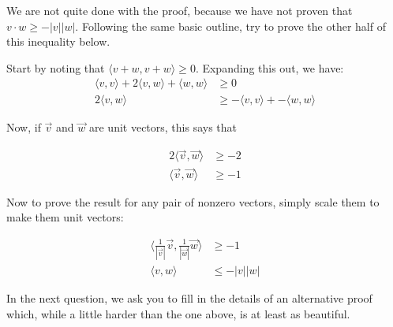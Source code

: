 \documentclass{ximera}
\begin{document}
We are not quite done with the proof, because we have not proven that $v \cdot w \geq -|v||w|$.  
Following the same basic outline, try to prove the other half of this inequality below.
\begin{free-response}
  Start by noting that $\langle v+w,v+w\rangle \geq 0 $.  Expanding this out, we have:
  \begin{align*}
  \langle v,v \rangle + 2 \langle v,w \rangle +\langle  w,w\rangle &\geq 0\\
  2\langle v,w \rangle &\geq -\langle v,v \rangle  + -\langle w,w\rangle
  \end{align*}
  
  Now, if $\vec{v}$ and $\vec{w}$ are unit vectors, this says that
  
  \begin{align*}
  2\langle \vec{v}, \vec{w} \rangle &\geq -2\\
  \langle \vec{v},\vec{w}\rangle &\geq -1
  \end{align*}
  
  Now to prove the result for any pair of nonzero vectors, simply scale them to make them unit vectors:
  
  \begin{align*}
  \langle \frac{1}{|\vec{v}|}\vec{v},\frac{1}{|\vec{w}|}\vec{w}\rangle &\geq -1\\
  \langle v,w\rangle &\leq  -|v||w|
  \end{align*}
\end{free-response}

In the next question, we ask you to fill in the details of an alternative proof which, while a little harder than the one above, is at least as beautiful.
\end{document}

